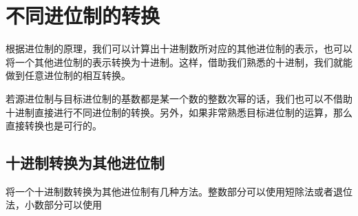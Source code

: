 \section{不同进位制的转换}\label{sec:NumberSystemBasics/PositionalNotationConversion}
    根据进位制的原理，我们可以计算出十进制数所对应的其他进位制的表示，也可以将一个其他进位制的表示转换为十进制。这样，借助我们熟悉的十进制，我们就能做到任意进位制的相互转换。

    若源进位制与目标进位制的基数都是某一个数的整数次幂的话，我们也可以不借助十进制直接进行不同进位制的转换。另外，如果非常熟悉目标进位制的运算，那么直接转换也是可行的。

    \subsection{十进制转换为其他进位制}\label{subsec:NumberSystemBasics/PositionalNotationConversion/FromDecimal}
        将一个十进制数转换为其他进位制有几种方法。整数部分可以使用短除法或者退位法，小数部分可以使用
